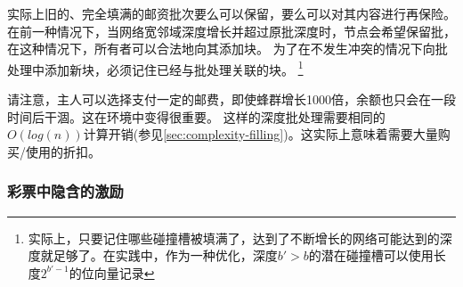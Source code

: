 实际上旧的、完全填满的邮资批次要么可以保留，要么可以对其内容进行再保险。在前一种情况下，当网络宽邻域深度增长并超过原批深度时，节点会希望保留批，在这种情况下，所有者可以合法地向其添加块。 
为了在不发生冲突的情况下向批处理中添加新块，必须记住已经与批处理关联的块。%
%
\footnote{实际上，只要记住哪些碰撞槽被填满了，达到了不断增长的网络可能达到的深度就足够了。在实践中，作为一种优化，深度$b' >b$的潜在碰撞槽可以使用长度$2^{b'-1}$的位向量记录}
%

请注意，主人可以选择支付一定的邮费，即使蜂群增长1000倍，余额也只会在一段时间后干涸。这在环境中变得很重要。
这样的深度批处理需要相同的$O(\mathit{log}(n))$计算开销(参见\ref{sec:complexity-filling})。这实际上意味着需要大量购买/使用的折扣。









\subsubsection{彩票中隐含的激励}

